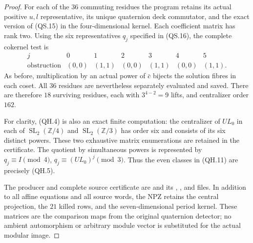 \begin{proof}
For each of the $36$ commuting residues the program
retains its actual positive $u,l$ representative,
its unique quaternion deck commutator, and the exact
version of (QS.15) in the four-dimensional kernel.
Each coefficient matrix has rank two.  Using the six
representatives $q_j$ specified in (QS.16), the complete
cokernel test is
\[
\begin{array}{c|cccccc}
 j&0&1&2&3&4&5\\\hline
 \text{obstruction}&(0,0)&(1,1)&(0,0)&(1,1)&(0,0)&(1,1).
\end{array}                                               \tag{QH.11}
\]
As before, multiplication by an actual power of $\bar c$
bijects the solution fibres in each coset.  All $36$
residues are nevertheless separately evaluated and saved.
There are therefore $18$ surviving residues, each with
$3^{4-2}=9$ lifts, and centralizer order $162$.

For clarity, (QH.4) is also an exact finite computation:
the centralizer of $UL_0$ in each of
$\operatorname{SL}_2(\mathbb Z/4)$ and
$\operatorname{SL}_2(\mathbb Z/3)$ has order six and
consists of its six distinct powers.  These two exhaustive
matrix enumerations are retained in the certificate.
The quotient by simultaneous powers is represented by
$q_j\equiv I\pmod4$, $q_j\equiv(UL_0)^j\pmod3$.
Thus the even classes in (QH.11) are precisely (QH.5).

The producer and complete source certificate are
and its , , and  files.
In addition to all affine equations and all source words,
the NPZ retains the central projection, the $21$ killed
rows, and the seven-dimensional period kernel.  These
matrices are the comparison maps from the original
quaternion detector; no ambient automorphism or arbitrary
module vector is substituted for the actual modular image.
\end{proof}
